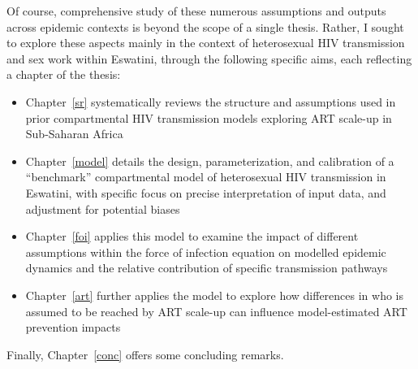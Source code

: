 \par
Of course, comprehensive study of these numerous assumptions and outputs
across epidemic contexts is beyond the scope of a single thesis.
Rather, I sought to explore these aspects mainly in the context of
heterosexual HIV transmission and sex work within Eswatini,
through the following specific aims, each reflecting a chapter of the thesis:
\begin{itemize}
  \item Chapter~\ref{sr} systematically reviews the structure and assumptions used in
  prior compartmental HIV transmission models exploring ART scale-up in Sub-Saharan Africa
  \item Chapter~\ref{model} details the design, parameterization, and calibration of
  a ``benchmark'' compartmental model of heterosexual HIV transmission in Eswatini,
  with specific focus on precise interpretation of input data, and adjustment for potential biases
  \item Chapter~\ref{foi} applies this model to examine
  the impact of different assumptions within the force of infection equation on
  modelled epidemic dynamics and the relative contribution of specific transmission pathways
  \item Chapter~\ref{art} further applies the model to explore
  how differences in who is assumed to be reached by ART scale-up
  can influence model-estimated ART prevention impacts
\end{itemize}
Finally, Chapter~\ref{conc} offers some concluding remarks.
